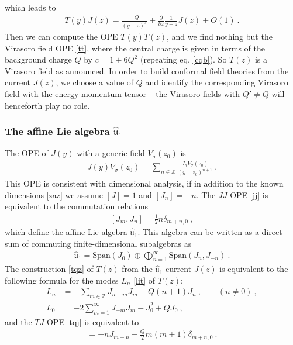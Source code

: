 \documentclass[12pt, a4paper, notitlepage, twoside]{report}
\numberwithin{equation}{section}
\theoremstyle{break}
\begin{document}
which leads to 
\begin{align}
 \boxed{T(y)J(z) = \frac{-Q}{(y-z)^3} +{\frac{\partial}{\partial z}}\frac{1}{y-z}J(z) + O(1)}\ .
\label{tqj}
\end{align}
Then we can compute the OPE $T(y)T(z)$, and we find nothing but the Virasoro field OPE \eqref{tt}, where the central charge is given in terms of the background charge $Q$ by $c = 1+6 Q^2$ (repeating eq. \eqref{cqb}). 
So $T(z)$ is a Virasoro field as announced. 
In order to build conformal field theories from the current $J(z)$, we choose a value of $Q$ and identify the corresponding Virasoro field with the energy-momentum tensor -- the Virasoro fields with $Q'\neq Q$ will henceforth play no role.

\subsubsection{The affine Lie algebra \boldmath $\hat{\mathfrak{u}}_1$}

The OPE of $J(y)$ with a generic field $V_\sigma(z_0)$ is 
\begin{align}
 \boxed{J(y) V_\sigma(z_0) = \sum_{n\in {\mathbb{Z}}} \frac{J_n V_\sigma(z_0)}{(y-z_0)^{n+1}}}\ .
\label{jvn}
\end{align}
This OPE is consistent with dimensional analysis, if in addition to the known dimensions \eqref{zaz} we assume $[J]=1$ and $[J_n]=-n$.
The $JJ$ OPE \eqref{jj} is equivalent to the commutation relations
\begin{align}
 \boxed{ [J_m,J_n] =  \frac12 n \delta_{m+n,0}}\ ,
\label{jmjn}
\end{align}
which define the affine Lie algebra \textbf{\boldmath $\hat{\mathfrak{u}}_1$}.
This algebra can be written as a direct sum of commuting finite-dimensional subalgebras as 
\begin{align}
 \hat{\mathfrak{u}}_1 = \text{Span}(J_0) \oplus \bigoplus_{n=1}^\infty \text{Span}(J_n,J_{-n}) \ .
\end{align}
The construction \eqref{tqz} of $T(z)$ from the $\hat{\mathfrak{u}}_1$ current $J(z)$ is equivalent to the following formula for the modes $L_n$ \eqref{lit} of $T(z)$:
\begin{align}
 L_n &= -\sum_{m\in{\mathbb{Z}}} J_{n-m}J_m + Q(n+1)J_n\ , \qquad (n\neq 0)\ ,
\label{lnj}
\\
L_0 &=-2\sum_{m=1}^\infty J_{-m}J_m -J_0^2+QJ_0 \ ,
\label{lzj}
\end{align}
and the $TJ$ OPE \eqref{tqj} is equivalent to 
\begin{align}
 [L_m,J_n] = -nJ_{m+n} -\frac{Q}{2}m(m+1) \delta_{m+n,0} \ . 
\end{align}
\end{document}
